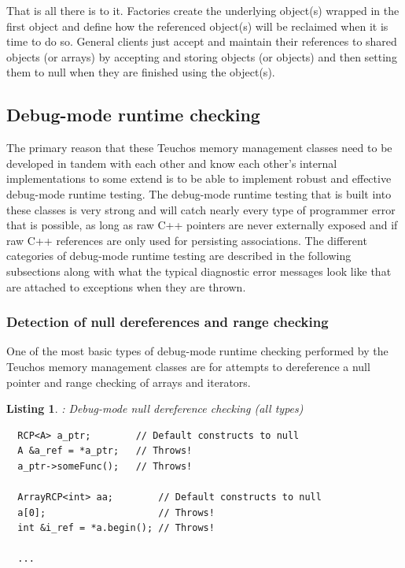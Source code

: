 \documentclass[pdf,ps2pdf,11pt]{SANDreport}
\newtheorem{listing}{Listing}
\begin{document}
That is all there is to it.  Factories create the underlying object(s)
wrapped in the first {} object and define how the referenced
object(s) will be reclaimed when it is time to do so.  General clients
just accept and maintain their references to shared objects (or
arrays) by accepting and storing {} objects (or
{} objects) and then setting them to null when they are
finished using the object(s).


%
{}\subsection{Debug-mode runtime checking}
\label{sec:debug-mode-runtime-checking}
%

The primary reason that these Teuchos memory management classes need
to be developed in tandem with each other and know each other's
internal implementations to some extend is to be able to implement
robust and effective debug-mode runtime testing.  The debug-mode
runtime testing that is built into these classes is very strong and
will catch nearly every type of programmer error that is possible, as
long as raw C++ pointers are never externally exposed and if raw C++
references are only used for persisting associations.  The different
categories of debug-mode runtime testing are described in the
following subsections along with what the typical diagnostic error
messages look like that are attached to exceptions when they are
thrown.


%
{}\subsubsection{Detection of null dereferences and range checking}
\label{sec:null-dereferences-range-checking}
%

One of the most basic types of debug-mode runtime checking performed
by the Teuchos memory management classes are for attempts to
dereference a null pointer and range checking of arrays and iterators.

\begin{listing}: Debug-mode null dereference checking (all types) \\
\label{listing:null-deref}
{\small\begin{verbatim}
  RCP<A> a_ptr;        // Default constructs to null
  A &a_ref = *a_ptr;   // Throws!
  a_ptr->someFunc();   // Throws!

  ArrayRCP<int> aa;        // Default constructs to null
  a[0];                    // Throws!
  int &i_ref = *a.begin(); // Throws!

  ...  
\end{verbatim}}
\end{listing}
\end{document}
